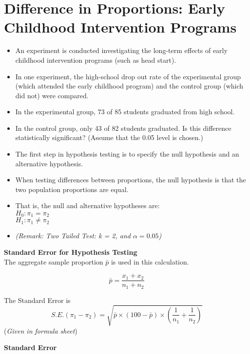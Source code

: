 \documentclass[a4paper,12pt]{article}
\begin{document}
\section*{Difference in Proportions: Early Childhood Intervention Programs}
\begin{itemize}
\item An experiment is conducted investigating the long-term effects of early childhood intervention programs (such as head start).
\item In one experiment, the high-school drop out rate of the experimental group (which attended the early childhood program)
and the control group (which did not) were compared.
\item In the experimental group, 73 of 85 students graduated from high school. \item In the control group, only 43 of 82 students graduated.
Is this difference statistically significant? (Assume that the 0.05 level is chosen.) 
\end{itemize}





\begin{itemize}
\item
The first step in hypothesis testing is to specify the null hypothesis and an alternative hypothesis.
\item When testing differences between proportions, the null hypothesis is that the two population proportions are equal.
\item That is, the null and alternative hypotheses are:\\
$H_0: \pi_1 = \pi_2$\\
$H_1: \pi_1 \neq \pi_2$\\
\item \textit{(Remark: Two Tailed Test: k = 2, and $\alpha = 0.05$)}
\end{itemize}




\begin{framed}
\noindent \textbf{Standard Error for Hypothesis Testing}\\
The aggregate sample proportion $\bar{p}$ is used in this calculation.

\[\bar{p} = \frac{x_1 + x_2}{n_1 + n_2}\]

\noindent The Standard Error is 
\[ S.E.(\pi_1 - \pi_2) = \sqrt{\bar{p} \times (100-\bar{p}) \times \left(\frac{1}{n_1}+ \frac{1}{n_2} \right)}\]
(\textit{Given in formula sheet})

\end{framed}
\textbf{Standard Error}
\end{document}
